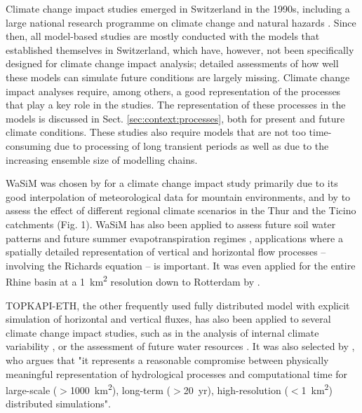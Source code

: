 \documentclass[10pt,a4paper]{article}
\begin{document}
Climate change impact studies emerged in Switzerland in the 1990s, including a large national research programme on climate change and natural hazards \citep{SNFS2021}. Since then, all model-based studies are mostly conducted with the models that established themselves in Switzerland, which have, however, not been specifically designed for climate change impact analysis; detailed assessments of how well these models can simulate future conditions are largely missing. Climate change impact analyses require, among others, a good representation of the processes that play a key role in the studies. The representation of these processes in the models is discussed in Sect. \ref{sec:context:processes}, both for present and future climate conditions. These studies also require models that are not too time-consuming due to processing of long transient periods as well as due to the increasing ensemble size of modelling chains.

WaSiM was chosen by \citet{Middelkoop2001} for a climate change impact study primarily due to its good interpolation of meteorological data for mountain environments, and by \citet{Jasper2004} to assess the effect of different regional climate scenarios in the Thur and the Ticino catchments (Fig. 1). WaSiM has also been applied to assess future soil water patterns \citep{Jasper2006, Rossler2012} and future summer evapotranspiration regimes \citep{Calanca2006}, applications where a spatially detailed representation of vertical and horizontal flow processes -- involving the Richards equation -- is important. It was even applied for the entire Rhine basin at a 1~km\textsuperscript{2} resolution down to Rotterdam by \citet{Kleinn2005}.

TOPKAPI-ETH, the other frequently used fully distributed model with explicit simulation of horizontal and vertical fluxes, has also been applied to several climate change impact studies, such as in the analysis of internal climate variability \citep{Fatichi2014}, or the assessment of future water resources \citep{Finger2012}. It was also selected by \citet{Fatichi2015}, who argues that "it represents a reasonable compromise between physically meaningful representation of hydrological processes and computational time for large-scale ($>$1000~km\textsuperscript{2}), long-term ($>$20~yr), high-resolution ($<$1~km\textsuperscript{2}) distributed simulations".
\end{document}
